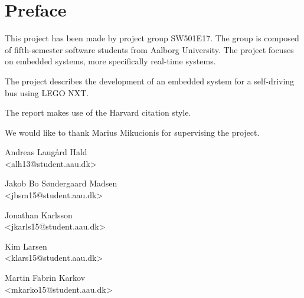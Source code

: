 \chapter*{Preface}

This project has been made by project group SW501E17. The group is composed of fifth-semester software students from Aalborg University. The project focuses on embedded systems, more specifically real-time systems. 

The project describes the development of an embedded system for a self-driving bus using LEGO NXT.

The report makes use of the Harvard citation style.

We would like to thank Marius Mikucionis for supervising the project.




\vspace{\baselineskip}\hfill
\vfill\noindent
\vspace{3\baselineskip}
\begin{minipage}[b]{0.45\textwidth}
 \centering
  Andreas Laugård Hald\\
 {\footnotesize <alh13@student.aau.dk>}
\end{minipage}
\hfill
\begin{minipage}[b]{0.45\textwidth}
 \centering
  Jakob Bo Søndergaard Madsen\\
 {\footnotesize <jbsm15@student.aau.dk>}
\end{minipage}
\vspace{3\baselineskip}
\begin{minipage}[b]{0.45\textwidth}
 \centering
  Jonathan Karlsson\\
 {\footnotesize <jkarls15@student.aau.dk>}
\end{minipage}
\hfill
\begin{minipage}[b]{0.45\textwidth}
 \centering
  Kim Larsen\\
 {\footnotesize <klars15@student.aau.dk>}
\end{minipage}
\vspace{3\baselineskip}
\begin{minipage}[b]{\textwidth}
 \centering
  Martin Fabrin Karkov\\
 {\footnotesize <mkarko15@student.aau.dk>}
\end{minipage}
